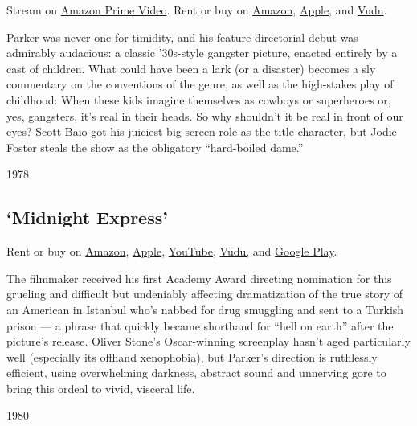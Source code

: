 Stream on
\href{https://www.amazon.com/gp/video/detail/B089DQLS25/ref=atv_dl_rdr?tag=justwatch09-20}{Amazon
Prime Video}. Rent or buy on
\href{https://www.amazon.com/gp/video/detail/B07K5HKTPF/ref=atv_dp_share_cu_r}{Amazon},
\href{https://itunes.apple.com/us/movie/bugsy-malone/id1438494267?ign-mpt=uo\%3D4}{Apple},
and
\href{https://www.vudu.com/content/movies/details/Bugsy-Malone/56780}{Vudu}.

Parker was never one for timidity, and his feature directorial debut was
admirably audacious: a classic '30s-style gangster picture, enacted
entirely by a cast of children. What could have been a lark (or a
disaster) becomes a sly commentary on the conventions of the genre, as
well as the high-stakes play of childhood: When these kids imagine
themselves as cowboys or superheroes or, yes, gangsters, it's real in
their heads. So why shouldn't it be real in front of our eyes? Scott
Baio got his juiciest big-screen role as the title character, but Jodie
Foster steals the show as the obligatory ``hard-boiled dame.''

1978

\hypertarget{midnight-express}{%
\subsection{`Midnight Express'}\label{midnight-express}}

Rent or buy on
\href{https://www.amazon.com/gp/video/detail/B0019TY084/ref=atv_dp_share_cu_r}{Amazon},
\href{https://itunes.apple.com/us/movie/midnight-express/id281675393?ign-mpt=uo\%3D4}{Apple},
\href{https://www.youtube.com/watch?v=uY8MnPgcPFw}{YouTube},
\href{https://www.vudu.com/content/movies/details/Midnight-Express/13396}{Vudu,}
and
\href{https://play.google.com/store/movies/details/Midnight_Express?gl=US\&hl=en\&id=uY8MnPgcPFw\&PAffiliateID=110l4uj}{Google
Play}.

The filmmaker received his first Academy Award directing nomination for
this grueling and difficult but undeniably affecting dramatization of
the true story of an American in Istanbul who's nabbed for drug
smuggling and sent to a Turkish prison --- a phrase that quickly became
shorthand for ``hell on earth'' after the picture's release. Oliver
Stone's Oscar-winning screenplay hasn't aged particularly well
(especially its offhand xenophobia), but Parker's direction is
ruthlessly efficient, using overwhelming darkness, abstract sound and
unnerving gore to bring this ordeal to vivid, visceral life.

1980

